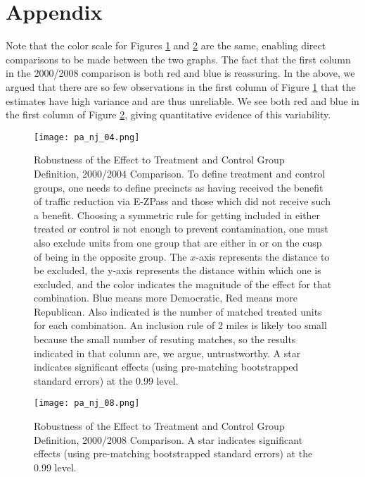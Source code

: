 \documentclass[11.0pt]{article}
\theoremstyle{definition}
\begin{document}
\clearpage 
\section*{Appendix}
Note that the color scale for Figures \ref{colorgram_04} and \ref{colorgram_08} are the same, enabling direct comparisons to be made between the two graphs. The fact that the first column in the 2000/2008 comparison is both red and blue is reassuring. In the above, we argued that there are so few observations in the first column of Figure \ref{colorgram_04} that the estimates have high variance and are thus unreliable. We see both red and blue in the first column of Figure \ref{colorgram_08}, giving quantitative evidence of this variability. 

\begin{figure}[htb!]
\begin{center}
\texttt{[image: pa\_nj\_04.png]}
\caption{Robustness of the Effect to Treatment and Control Group Definition, 2000/2004 Comparison. To define treatment and control groups, one needs to define precincts as having received the benefit of traffic reduction via E-ZPass and those which did not receive such a benefit. Choosing a symmetric rule for getting included in either treated or control is not enough to prevent contamination, one must also exclude units from one group that are  either in or on the cusp of being in the opposite group.  The $x$-axis represents the distance to be excluded, the y-axis represents the distance within which one is excluded, and the color indicates the magnitude of the effect for that combination. Blue means more Democratic, Red means more Republican.  Also indicated is the number of matched treated units for each combination. An inclusion rule of 2 miles is likely too small because the small number of resuting matches, so the results indicated in that column are, we argue, untrustworthy. A star indicates significant effects (using pre-matching bootstrapped standard errors) at the 0.99 level.} 
\label{colorgram_04}
\end{center}
\end{figure}

\begin{figure}[htb!]
\begin{center}
\texttt{[image: pa\_nj\_08.png]}
\caption{Robustness of the Effect to Treatment and Control Group Definition, 2000/2008 Comparison. A star indicates significant effects (using pre-matching bootstrapped standard errors) at the 0.99 level.} 
\label{colorgram_08}
\end{center}
\end{figure}
\end{document}
